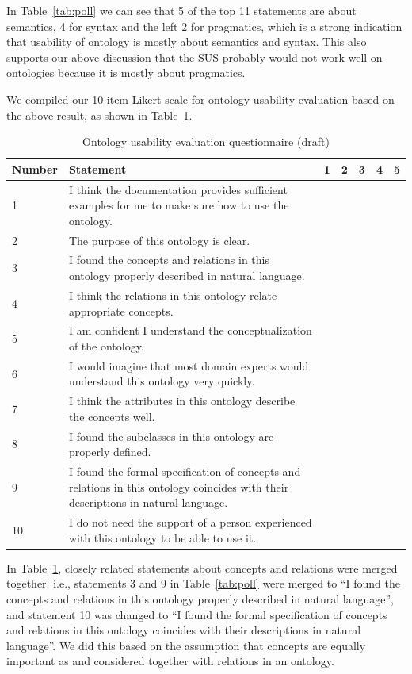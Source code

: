 In Table~\ref{tab:poll} we can see that 5 of the top 11 statements are about semantics, 4 for syntax and the left 2 for pragmatics, which is a strong indication that usability of ontology is mostly about semantics and syntax. This also supports our above discussion that the SUS probably would not work well on ontologies because it is mostly about pragmatics.

We compiled our 10-item Likert scale for ontology usability evaluation based on the above result, as shown in Table~\ref{tab:ous-draft}.
\begin{table}
	\begin{center}
		\caption{Ontology usability evaluation questionnaire (draft)}
		\label{tab:ous-draft}
		\begin{tabular}{|p{}|p{}|l|l|l|l|l|}
			\hline Number & Statement & 1 & 2 & 3 & 4 & 5 \\ 
			\hline 1 & I think the documentation provides sufficient examples for me to make sure how to use the ontology. &  &  &  &  &  \\ 
			\hline 2 & The purpose of this ontology is clear. &  &  &  &  &  \\ 
			\hline 3 & I found the concepts and relations in this ontology properly described in natural language. &  &  &  &  &  \\ 
			\hline 4 & I think the relations in this ontology relate appropriate concepts. &  &  &  &  &  \\ 
			\hline 5 & I am confident I understand the conceptualization of the ontology. &  &  &  &  &  \\ 
			\hline 6 & I would imagine that most domain experts would understand this ontology very quickly. &  &  &  &  &  \\ 
			\hline 7 & I think the attributes in this ontology describe the concepts well. &  &  &  &  &  \\ 
			\hline 8 & I found the subclasses in this ontology are properly defined. &  &  &  &  &  \\ 
			\hline 9 & I found the formal specification of concepts and relations in this ontology coincides with their descriptions in natural language. &  &  &  &  &  \\ 
			\hline 10 & I do not need the support of a person experienced with this ontology to be able to use it. &  &  &  &  &  \\ 
			\hline 
		\end{tabular} 
	\end{center}
\end{table}
In Table~\ref{tab:ous-draft}, closely related statements about concepts
and relations were merged together. i.e., statements
3 and 9 in Table~\ref{tab:poll} were merged to ``I found the
concepts and relations in this ontology properly described
in natural language'', and statement 10 was
changed to ``I found the formal specification of concepts
and relations in this ontology coincides with
their descriptions in natural language''. We did this
based on the assumption that concepts are equally
important as and considered together with relations
in an ontology.

